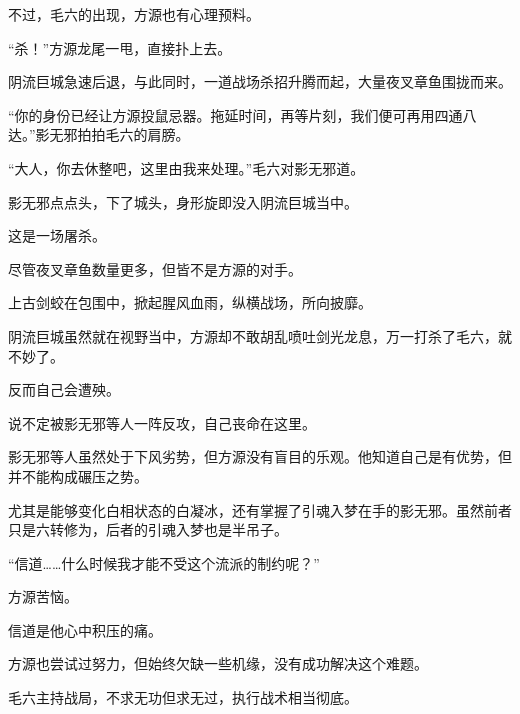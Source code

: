 \begin{this_body}
不过，毛六的出现，方源也有心理预料。

“杀！”方源龙尾一甩，直接扑上去。

阴流巨城急速后退，与此同时，一道战场杀招升腾而起，大量夜叉章鱼围拢而来。

“你的身份已经让方源投鼠忌器。拖延时间，再等片刻，我们便可再用四通八达。”影无邪拍拍毛六的肩膀。

“大人，你去休整吧，这里由我来处理。”毛六对影无邪道。

影无邪点点头，下了城头，身形旋即没入阴流巨城当中。

这是一场屠杀。

尽管夜叉章鱼数量更多，但皆不是方源的对手。

上古剑蛟在包围中，掀起腥风血雨，纵横战场，所向披靡。

阴流巨城虽然就在视野当中，方源却不敢胡乱喷吐剑光龙息，万一打杀了毛六，就不妙了。

反而自己会遭殃。

说不定被影无邪等人一阵反攻，自己丧命在这里。

影无邪等人虽然处于下风劣势，但方源没有盲目的乐观。他知道自己是有优势，但并不能构成碾压之势。

尤其是能够变化白相状态的白凝冰，还有掌握了引魂入梦在手的影无邪。虽然前者只是六转修为，后者的引魂入梦也是半吊子。

“信道……什么时候我才能不受这个流派的制约呢？”

方源苦恼。

信道是他心中积压的痛。

方源也尝试过努力，但始终欠缺一些机缘，没有成功解决这个难题。

毛六主持战局，不求无功但求无过，执行战术相当彻底。

\end{this_body}

